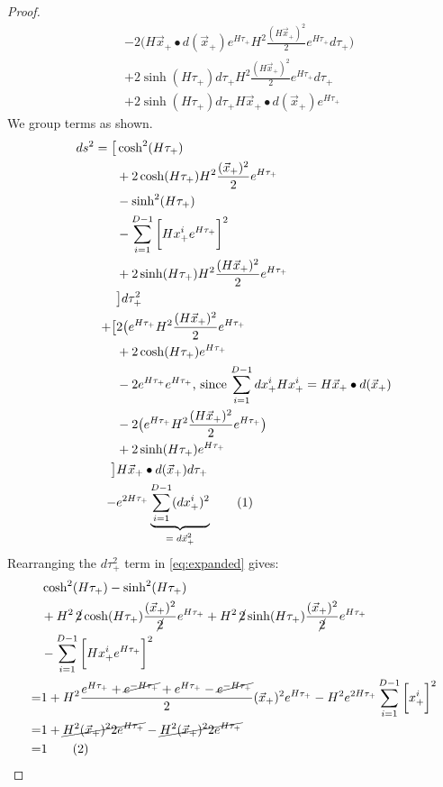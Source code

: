 \documentclass[]{article}
\newcommand\numberthis{\addtocounter{equation}{1}\tag{\theequation}}
\begin{document}
\begin{proof}
\begin{align*}
	&-2\big(H\vec{x}_+\bullet d(\vec{x}_+)e^{H\tau_+} H^2\frac{(H\vec{x}_+)^2}{2}e^{H\tau_+}d\tau_+\big)\\
	&+2\sinh(H\tau_+)d\tau_+ H^2\frac{(H\vec{x}_+)^2}{2}e^{H\tau_+}d\tau_+\\
	&+2\sinh(H\tau_+)d\tau_+ H\vec{x}_+\bullet d(\vec{x}_+)e^{H\tau_+} 	
	\end{align*}
	We group terms as shown.
	\begin{align*}
	ds^2=\big[&\cosh^2(H\tau_+)\\
	&+ 2\cosh(H\tau_+) H^2\frac{(\vec{x}_+)^2}{2}e^{H\tau_+}\\
	&-\sinh^2(H\tau_+)\\
	&- \sum_{i=1}^{D-1}\bigg[ H x^i_+e^{H\tau_+}\bigg]^2\\
	&+2\sinh(H\tau_+) H^2\frac{(H\vec{x}_+)^2}{2}e^{H\tau_+}\\	
	&\big] d\tau_+^2\\
	+\big[&2\big(e^{H\tau_+} H^2\frac{(H\vec{x}_+)^2}{2}e^{H\tau_+}\\
	&+2\cosh(H\tau_+) e^{H\tau_+}\\
	&- 2e^{H\tau_+}  e^{H\tau_+}\text{, since $\sum_{i=1}^{D-1}dx^i_+ H x^i_+=H\vec{x}_+\bullet d(\vec{x}_+)$}\\
	&-2\big(e^{H\tau_+} H^2\frac{(H\vec{x}_+)^2}{2}e^{H\tau_+}\big)\\
	&+2\sinh(H\tau_+)e^{H\tau_+}\\
	\big]&H\vec{x}_+\bullet d(\vec{x}_+)d\tau_+\\
	-& e^{2H\tau_+}\underbrace{\sum_{i=1}^{D-1}(dx^i_+)^2}_\text{$=d\vec{x}^2_+$}\numberthis\label{eq:expanded}
	\end{align*}
	Rearranging the $d\tau_+^2$ term in \eqref{eq:expanded} gives:
	\begin{align*}
	&\cosh^2(H\tau_+)-\sinh^2(H\tau_+)\\
	&+  H^2\, \cancel{2}\cosh(H\tau_+)\frac{(\vec{x}_+)^2}{\cancel{2}}e^{H\tau_+}+H^2\, \cancel{2}\sinh(H\tau_+) \frac{(\vec{x}_+)^2}{\cancel{2}}e^{H\tau_+}\\
	&- \sum_{i=1}^{D-1}\bigg[ H x^i_+e^{H\tau_+}\bigg]^2\\
	=& 1 +H^2\frac{e^{H\tau_+}+\cancel{e^{-H\tau_+}}+e^{H\tau_+}-\cancel{e^{-H\tau_+}}}{2}(\vec{x}_+)^2e^{H\tau_+} - H^2e^{2H\tau_+}\sum_{i=1}^{D-1}\bigg[  x^i_+ \bigg]^2\\
	=& 1 + \cancel{H^2 (\vec{x}_+)^2 2e^{H\tau_+}} - \cancel{H^2 (\vec{x}_+)^2 2e^{H\tau_+}}\\
	=&1 \numberthis\label{eq:d_tau_2}
	\end{align*}
	

\end{proof}
\end{document}
